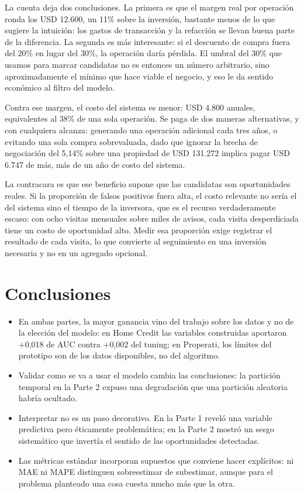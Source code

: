 \documentclass[11pt,a4paper]{article}
\begin{document}
La cuenta deja dos conclusiones. La primera es que el margen real por operación ronda los USD 12.600, un 11\% sobre la inversión, bastante menos de lo que sugiere la intuición: los gastos de transacción y la refacción se llevan buena parte de la diferencia. La segunda es más interesante: si el descuento de compra fuera del 20\% en lugar del 30\%, la operación daría pérdida. El umbral del 30\% que usamos para marcar candidatas no es entonces un número arbitrario, sino aproximadamente el mínimo que hace viable el negocio, y eso le da sentido económico al filtro del modelo.

Contra ese margen, el costo del sistema es menor: USD 4.800 anuales, equivalentes al 38\% de una sola operación. Se paga de dos maneras alternativas, y con cualquiera alcanza: generando una operación adicional cada tres años, o evitando una sola compra sobrevaluada, dado que ignorar la brecha de negociación del 5,14\% sobre una propiedad de USD 131.272 implica pagar USD 6.747 de más, más de un año de costo del sistema.

La contracara es que ese beneficio supone que las candidatas son oportunidades reales. Si la proporción de falsos positivos fuera alta, el costo relevante no sería el del sistema sino el tiempo de la inversora, que es el recurso verdaderamente escaso: con ocho visitas mensuales sobre miles de avisos, cada visita desperdiciada tiene un costo de oportunidad alto. Medir esa proporción exige registrar el resultado de cada visita, lo que convierte al seguimiento en una inversión necesaria y no en un agregado opcional.

\section*{Conclusiones}

\begin{itemize}
\item
  En ambas partes, la mayor ganancia vino del trabajo sobre los datos y no de la elección del modelo: en Home Credit las variables construidas aportaron +0,018 de AUC contra +0,002 del tuning; en Properati, los límites del prototipo son de los datos disponibles, no del algoritmo.
\item
  Validar como se va a usar el modelo cambia las conclusiones: la partición temporal en la Parte 2 expuso una degradación que una partición aleatoria habría ocultado.
\item
  Interpretar no es un paso decorativo. En la Parte 1 reveló una variable predictiva pero éticamente problemática; en la Parte 2 mostró un sesgo sistemático que invertía el sentido de las oportunidades detectadas.
\item
  Las métricas estándar incorporan supuestos que conviene hacer explícitos: ni MAE ni MAPE distinguen sobreestimar de subestimar, aunque para el problema planteado una cosa cuesta mucho más que la otra.
\end{itemize}
\end{document}
